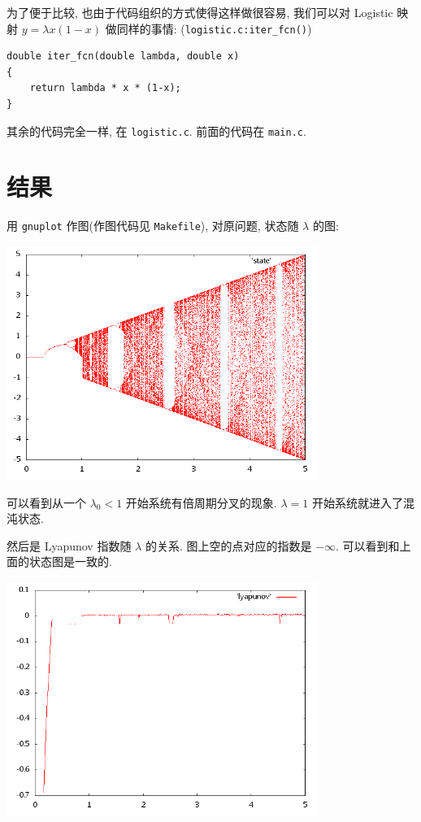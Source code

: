 \documentclass{ctexart}
\begin{document}
为了便于比较, 也由于代码组织的方式使得这样做很容易, 我们可以对 Logistic 映射
$y = \lambda x(1-x)$ 做同样的事情: (\verb|logistic.c:iter_fcn()|)
\begin{verbatim}
double iter_fcn(double lambda, double x)
{
    return lambda * x * (1-x);
}
\end{verbatim}
其余的代码完全一样, 在 \verb|logistic.c|. 前面的代码在 \verb|main.c|.

\section{结果}
用 \verb|gnuplot| 作图(作图代码见 \verb|Makefile|), 对原问题, 状态随 $\lambda$
的图:
\begin{center}
\includegraphics[width=4in]{state.png}
\end{center}
可以看到从一个 $\lambda_0<1$ 开始系统有倍周期分叉的现象.
$\lambda=1$ 开始系统就进入了混沌状态.

然后是 Lyapunov 指数随 $\lambda$ 的关系. 图上空的点对应的指数是 $-\infty$.
可以看到和上面的状态图是一致的.
\begin{center}
\includegraphics[width=4in]{lyapunov.png}
\end{center}
\end{document}
